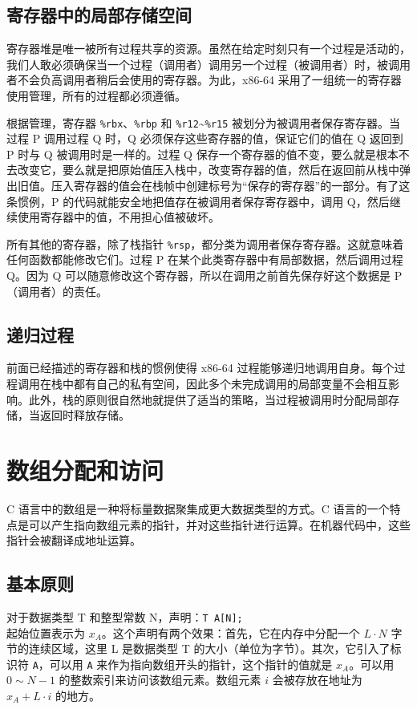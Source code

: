 \subsection{寄存器中的局部存储空间}

寄存器堆是唯一被所有过程共享的资源。虽然在给定时刻只有一个过程是活动的，我们人敢必须确保当一个过程（调用者）调用另一个过程（被调用者）时，被调用者不会负高调用者稍后会使用的寄存器。为此，x86-64 采用了一组统一的寄存器使用管理，所有的过程都必须遵循。

根据管理，寄存器 \verb|%rbx|、\verb|%rbp| 和 \verb|%r12|\~{}\verb|%r15| 被划分为被调用者保存寄存器。当过程 P 调用过程 Q 时，Q 必须保存这些寄存器的值，保证它们的值在 Q 返回到 P 时与 Q 被调用时是一样的。过程 Q 保存一个寄存器的值不变，要么就是根本不去改变它，要么就是把原始值压入栈中，改变寄存器的值，然后在返回前从栈中弹出旧值。压入寄存器的值会在栈帧中创建标号为“保存的寄存器”的一部分。有了这条惯例，P 的代码就能安全地把值存在被调用者保存寄存器中，调用 Q，然后继续使用寄存器中的值，不用担心值被破坏。

所有其他的寄存器，除了栈指针 \verb|%rsp|，都分类为调用者保存寄存器。这就意味着任何函数都能修改它们。过程 P 在某个此类寄存器中有局部数据，然后调用过程 Q。因为 Q 可以随意修改这个寄存器，所以在调用之前首先保存好这个数据是 P（调用者）的责任。

\subsection{递归过程}

前面已经描述的寄存器和栈的惯例使得 x86-64 过程能够递归地调用自身。每个过程调用在栈中都有自己的私有空间，因此多个未完成调用的局部变量不会相互影响。此外，栈的原则很自然地就提供了适当的策略，当过程被调用时分配局部存储，当返回时释放存储。

\section{数组分配和访问}

C 语言中的数组是一种将标量数据聚集成更大数据类型的方式。C 语言的一个特点是可以产生指向数组元素的指针，并对这些指针进行运算。在机器代码中，这些指针会被翻译成地址运算。

\subsection{基本原则}

对于数据类型 T 和整型常数 N，声明：\verb|T A[N];| \\ 起始位置表示为 $x_A$。这个声明有两个效果：首先，它在内存中分配一个 $L \cdot N$ 字节的连续区域，这里 L 是数据类型 T 的大小（单位为字节）。其次，它引入了标识符 \verb|A|，可以用 \verb|A| 来作为指向数组开头的指针，这个指针的值就是 $x_A$。可以用 $0 \sim N-1$ 的整数索引来访问该数组元素。数组元素 $i$ 会被存放在地址为 $x_A + L \cdot i$ 的地方。

